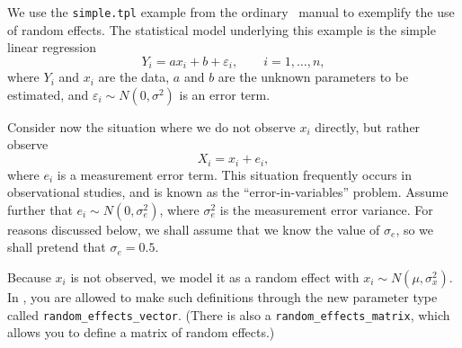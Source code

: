 \documentclass{admbmanual}
\begin{document}
We use the \texttt{simple.tpl} example from the ordinary \scAB\ manual to
exemplify the use of random effects. The statistical model underlying this
example is the simple linear regression
\[
Y_i=ax_i+b+\varepsilon_i,\qquad i=1,\ldots,n,
\]
where $Y_i$ and $x_i$ are the data, $a$ and $b$ are the unknown parameters to be
estimated, and $\varepsilon_i\sim N(0,\sigma^2)$ is an error term.

Consider now the situation where we do not observe $x_i$ directly, but rather
observe
\[
X_i=x_i+e_i,
\]
where $e_i$ is a measurement error term. This situation frequently occurs in
observational studies, and is known as the ``error-in-variables'' problem.
Assume further that $e_i\sim N(0,\sigma_e^2)$, where $\sigma_e^2$ is the
measurement error variance. For reasons discussed below, we shall assume that we
know the value of $\sigma_e$, so we shall pretend that $\sigma_e=0.5$.

Because $x_i$ is not observed, we model it as a random effect with $x_i\sim
N(\mu,\sigma_x^2)$. In \scAR, you are allowed to make such definitions
through the new parameter type called \texttt{random\_effects\_vector}.
 (There is also a
\texttt{random\_effects\_matrix}, which allows you to define a matrix of random
effects.) 
\end{document}

